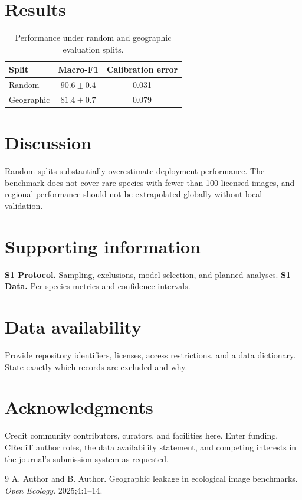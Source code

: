 \documentclass[12pt]{article}
\begin{document}
\section{Results}
\begin{table}[h]
\caption{Performance under random and geographic evaluation splits.}
\centering
\begin{tabular}{lcc}
\toprule
Split & Macro-F1 & Calibration error \\
\midrule
Random & $90.6\pm0.4$ & 0.031 \\
Geographic & $81.4\pm0.7$ & 0.079 \\
\bottomrule
\end{tabular}
\end{table}

\section{Discussion}
Random splits substantially overestimate deployment performance. The benchmark
does not cover rare species with fewer than 100 licensed images, and regional
performance should not be extrapolated globally without local validation.

\section*{Supporting information}
\textbf{S1 Protocol.} Sampling, exclusions, model selection, and planned
analyses. \textbf{S1 Data.} Per-species metrics and confidence intervals.

\section*{Data availability}
Provide repository identifiers, licenses, access restrictions, and a data
dictionary. State exactly which records are excluded and why.

\section*{Acknowledgments}
Credit community contributors, curators, and facilities here. Enter funding,
CRediT author roles, the data availability statement, and competing interests
in the journal's submission system as requested.

\begin{thebibliography}{9}
 A. Author and B. Author. Geographic leakage in ecological
image benchmarks. \textit{Open Ecology}. 2025;4:1--14.
\end{thebibliography}
\end{document}
